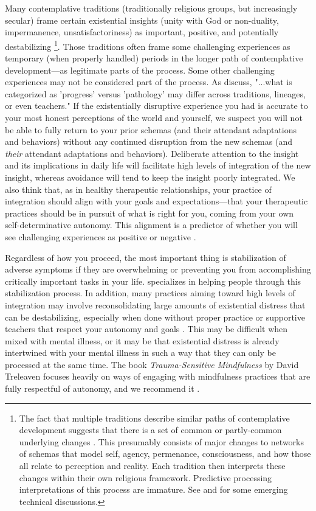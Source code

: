\documentclass[12pt,letterpaper]{book}
\begin{document}
Many contemplative traditions (traditionally religious groups, but increasingly secular) frame certain existential insights (unity with God or non-duality, impermanence, unsatisfactoriness) as important, positive, and potentially destabilizing \cite{ingram2018mastering}\footnote{The fact that multiple traditions describe similar paths of contemplative development suggests that there is a set of common or partly-common underlying changes \cite{ingram2018mastering}. This presumably consists of major changes to networks of schemas that model self, agency, permenance, consciousness, and how those all relate to perception and reality. Each tradition then interprets these changes within their own religious framework. Predictive processing interpretations of this process are immature. See \textcite{laukkonenNone} and \textcite{laukkonen2025beautiful} for some emerging technical discussions.}. Those traditions often frame some challenging experiences as temporary (when properly handled) periods in the longer path of contemplative development—as legitimate parts of the process. Some other challenging experiences may not be considered part of the process. As \textcite{lindahl2017varieties} discuss, "...what is categorized as 'progress' versus 'pathology' may differ across traditions, lineages, or even teachers." If the existentially disruptive experience you had is accurate to your most honest perceptions of the world and yourself, we suspect you will not be able to fully return to your prior schemas (and their attendant adaptations and behaviors) without any continued disruption from the new schemas (and \textit{their} attendant adaptations and behaviors). Deliberate attention to the insight and its implications in daily life will facilitate high levels of integration of the new insight, whereas avoidance will tend to keep the insight poorly integrated. We also think that, as in healthy therapeutic relationships, your practice of integration should align with your goals and expectations—that your therapeutic practices should be in pursuit of what is right for you, coming from your own self-determinative autonomy. This alignment is a predictor of whether you will see challenging experiences as positive or negative \cite{lindahl2017varieties}.

Regardless of how you proceed, the most important thing is stabilization of adverse symptoms if they are overwhelming or preventing you from accomplishing critically important tasks in your life. \textcite{cheetahHouse} specializes in helping people through this stabilization process. In addition, many practices aiming toward high levels of integration may involve reconsolidating large amounts of existential distress \cite{ingram2018mastering} that can be destabilizing, especially when done without proper practice or supportive teachers that respect your autonomy and goals \cite{lindahl2017varieties}. This may be difficult when mixed with mental illness, or it may be that existential distress is already intertwined with your mental illness in such a way that they can only be processed at the same time. The book \textit{Trauma-Sensitive Mindfulness} by David Treleaven focuses heavily on ways of engaging with mindfulness practices that are fully respectful of autonomy, and we recommend it \cite{treleaven2018trauma}.
\end{document}
